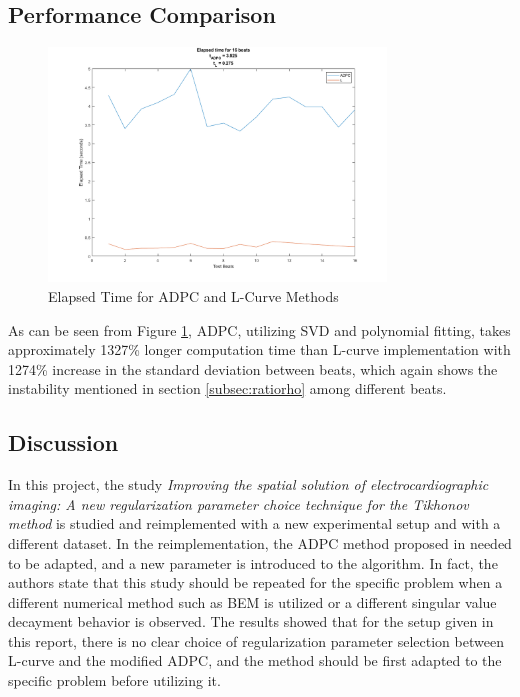 \documentclass[draftcls, onecolumn, journal]{IEEEtran}
\begin{document}
\subsection{Performance Comparison}

\begin{figure}[h]
\centering
\includegraphics[width=0.8\textwidth]{../images/elapsed_times.png}
\caption{Elapsed Time for ADPC and L-Curve Methods}\label{fig:timecomp}
\end{figure}

As can be seen from Figure \ref{fig:timecomp}, ADPC, utilizing SVD and polynomial fitting, takes approximately 1327\% longer computation time than L-curve implementation with 1274\% increase in the standard deviation between beats, which again shows the instability mentioned in section \ref{subsec:ratiorho} among different beats. 

\newpage

\subsection{Discussion}

In this project, the study \textit{Improving the spatial solution of electrocardiographic imaging: A new regularization parameter choice technique for the Tikhonov method} is studied and reimplemented with a new experimental setup and with a different dataset. In the reimplementation, the ADPC method proposed in \cite{chamorro2017improving} needed to be adapted, and a new parameter is introduced to the algorithm. In fact, the authors state that this study should be repeated for the specific problem when a different numerical method such as BEM is utilized or a different singular value decayment behavior is observed. The results showed that for the setup given in this report, there is no clear choice of regularization parameter selection between L-curve and the modified ADPC, and the method should be first adapted to the specific problem before utilizing it.
\end{document}

